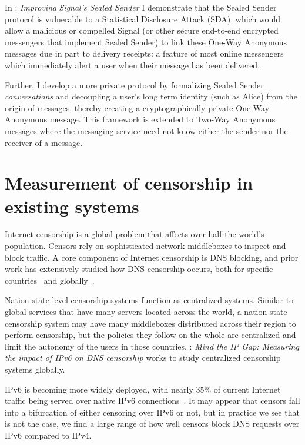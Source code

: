 In : \emph{Improving Signal's Sealed Sender} I demonstrate that
the Sealed Sender protocol is vulnerable to a Statistical Disclosure Attack
(SDA), which would allow a malicious or compelled Signal (or other secure
end-to-end encrypted messengers that implement Sealed Sender) to link these
One-Way Anonymous messages due in part to delivery receipts: a feature of most
online messengers which immediately alert a user when their message has been
delivered.

Further, I develop a more private protocol by formalizing Sealed Sender
\emph{conversations} and decoupling a user's long term identity (such as Alice)
from the origin of messages, thereby creating a cryptographically private
One-Way Anonymous message. This framework is extended to Two-Way Anonymous
messages where the messaging service need not know either the sender nor the
receiver of a message. 

\section{Measurement of censorship in existing systems}
Internet censorship is a global problem that affects over half the world's
population. Censors rely on sophisticated network middleboxes to inspect and
block traffic. A core component of Internet censorship is DNS blocking, and
prior work has extensively studied how DNS censorship occurs, both for specific
countries~\cite{Anonymous2020:TripletCensors,USESEC21:GFWatch} and
globally~\cite{kuhrer2015going,dagon2008corrupted,pearce2017global,scott2016satellite}.

Nation-state level censorship systems function as centralized systems. Similar
to global services that have many servers located across the world, a
nation-state censorship system may have many middleboxes distributed across
their region to perform censorship, but the policies they follow on the whole
are centralized and limit the autonomy of the users in those countries.
: \emph{Mind the IP Gap: Measuring the impact of IPv6 on DNS
censorship} works to study centralized censorship systems globally. 

IPv6 is becoming more widely deployed, with nearly 35\% of current Internet
traffic being served over native IPv6 connections~\cite{Google-IPv6}. It may
appear that censors fall into a bifurcation of either censoring over IPv6 or
not, but in practice we see that is not the case, we find a large range of how
well censors block DNS requests over IPv6 compared to IPv4.

